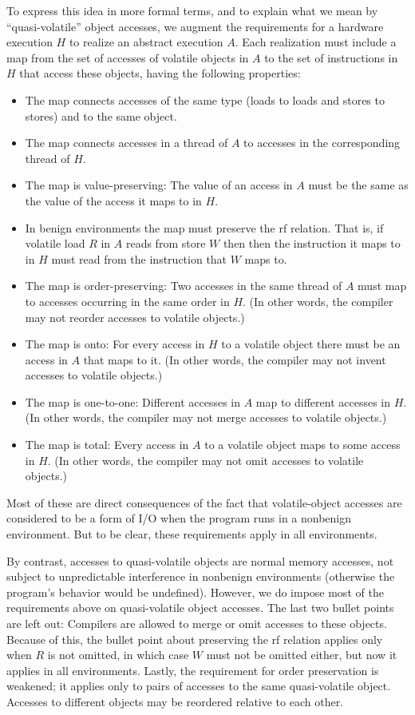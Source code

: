 \documentclass[10]{article}
\begin{document}
To express this idea in more formal terms,
and to explain what we mean by ``quasi-volatile'' object accesses,
we augment the
requirements for a hardware execution $H$ to realize an abstract
execution $A$.
Each realization must include a map from the set of accesses of
volatile objects in $A$ to the set of instructions in $H$ that access
these objects, having the following properties:
\begin{itemize}
\item	The map connects accesses of the same type (loads to loads
	and stores to stores) and to the same object.
\item	The map connects accesses in a thread of $A$ to accesses in
	the corresponding thread of $H$.
\item	The map is value-preserving: The value of an access in $A$ must be
	the same as the value of the access it maps to in $H$.
\item	In benign environments the map must preserve the rf relation.
	That is, if volatile load $R$ in $A$ reads from store $W$ then
	then the instruction it maps to in $H$ must read from the
	instruction that $W$ maps to.
\item	The map is order-preserving: Two accesses in the same thread
	of $A$ must map to accesses occurring in the same order in $H$.
	(In other words, the compiler may not reorder accesses
	to volatile objects.)
\item	The map is onto: For every access in $H$ to a volatile object
	there must be an access in $A$ that maps to it.
	(In other words, the compiler may not invent accesses to
	volatile objects.)
\item	The map is one-to-one: Different accesses in $A$ map to
	different accesses in $H$.
	(In other words, the compiler may not merge accesses to
	volatile objects.)
\item	The map is total: Every access in $A$ to a volatile object
	maps to some access in $H$.
	(In other words, the compiler may not omit accesses to
	volatile objects.)
\end{itemize}
Most of these are direct consequences of the fact that volatile-object
accesses are considered to be a form of I/O when the program runs
in a nonbenign environment.
But to be clear, these requirements apply in all environments.

By contrast, accesses to quasi-volatile objects are normal memory
accesses, not subject to unpredictable interference in nonbenign
environments (otherwise the program's behavior would be undefined).
However, we do impose most of the requirements above on quasi-volatile
object accesses.
The last two bullet points are left out: Compilers are allowed to merge or
omit accesses to these objects.
Because of this, the bullet point about preserving the rf relation
applies only when $R$ is not omitted, in which case $W$ must not
be omitted either, but now it applies in all environments.
Lastly, the requirement for order preservation is weakened; it applies
only to pairs of accesses to the same quasi-volatile object.
Accesses to different objects may be reordered relative to each other.
\end{document}
